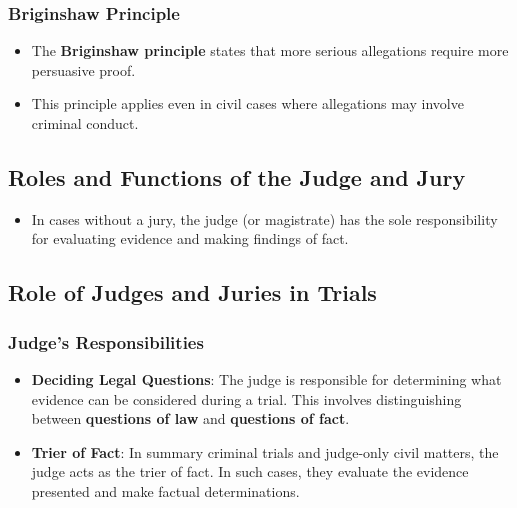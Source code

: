 \subsubsection{Briginshaw Principle}\label{briginshaw-principle}

\begin{itemize}
\tightlist
\item
  The \textbf{Briginshaw principle} states that more serious allegations
  require more persuasive proof.
\item
  This principle applies even in civil cases where allegations may
  involve criminal conduct.
\end{itemize}

\subsection{Roles and Functions of the Judge and
Jury}\label{roles-and-functions-of-the-judge-and-jury}

\begin{itemize}
\tightlist
\item
  In cases without a jury, the judge (or magistrate) has the sole
  responsibility for evaluating evidence and making findings of fact.
\end{itemize}

\subsection{Role of Judges and Juries in
Trials}\label{role-of-judges-and-juries-in-trials}

\subsubsection{Judge's Responsibilities}\label{judges-responsibilities}

\begin{itemize}
\tightlist
\item
  \textbf{Deciding Legal Questions}: The judge is responsible for
  determining what evidence can be considered during a trial. This
  involves distinguishing between \textbf{questions of law} and
  \textbf{questions of fact}.
\item
  \textbf{Trier of Fact}: In summary criminal trials and judge-only
  civil matters, the judge acts as the trier of fact. In such cases,
  they evaluate the evidence presented and make factual determinations.
\end{itemize}

